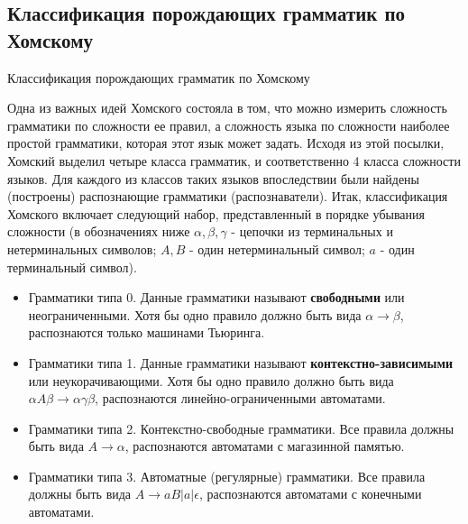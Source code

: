 \documentclass[12pt, pdf, hyperref={unicode},handout]{beamer}
\begin{document}
\subsection{Классификация порождающих грамматик по Хомскому}
\begin{frame}{Классификация порождающих грамматик по Хомскому}
  \begin{block}

    \small{
      Одна из важных идей Хомского состояла в том, что можно измерить сложность грамматики по сложности ее правил, а сложность языка по сложности наиболее простой грамматики, которая этот язык может задать.  Исходя из этой посылки, Хомский выделил четыре класса грамматик, и соответственно 4 класса сложности языков. Для каждого из классов таких языков впоследствии были найдены (построены) распознающие грамматики (распознаватели). Итак, классификация Хомского включает следующий набор, представленный в порядке убывания сложности (в обозначениях ниже $\alpha,\beta, \gamma$ - цепочки из терминальных и нетерминальных символов; $A,B$ - один нетерминальный символ; $a$ - один терминальный символ).

      \begin{itemize}
      \item{Грамматики типа 0. Данные грамматики называют \textbf{свободными} или неограниченными. Хотя бы одно правило должно быть вида $\alpha\rightarrow\beta$, распознаются только машинами Тьюринга.}
      \item{Грамматики типа 1. Данные грамматики называют \textbf{контекстно-зависимыми} или неукорачивающими. Хотя бы одно правило должно быть вида $\alpha A\beta\rightarrow \alpha\gamma\beta$, распознаются линейно-ограниченными автоматами.}
      \item{Грамматики типа 2. Контекстно-свободные грамматики. Все правила должны быть вида $A\rightarrow \alpha$, распознаются автоматами с магазинной памятью.}
        \item{Грамматики типа 3. Автоматные (регулярные) грамматики. Все правила должны быть вида $A\rightarrow aB|a|\epsilon$, распознаются автоматами с конечными автоматами.}
        \end{itemize}
      }

  \end{block}
  
\end{frame}
\end{document}
